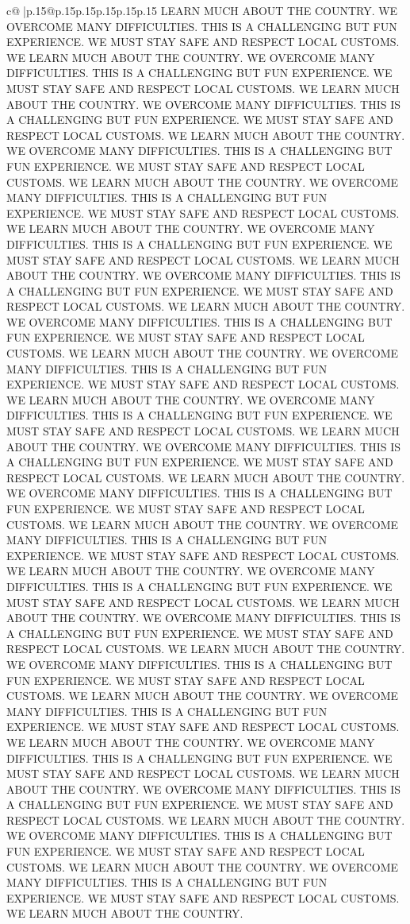 \documentclass{article}
\begin{document}
{\begin{supertabular}{c@{$\;$}|p{.15\linewidth}@{}p{.15\linewidth}p{.15\linewidth}p{.15\linewidth}p{.15\linewidth}p{.15\linewidth}}
{{{LEARN MUCH ABOUT THE COUNTRY. WE OVERCOME MANY DIFFICULTIES. THIS IS A CHALLENGING BUT FUN EXPERIENCE. WE MUST STAY SAFE AND RESPECT LOCAL CUSTOMS. WE LEARN MUCH ABOUT THE COUNTRY. WE OVERCOME MANY DIFFICULTIES. THIS IS A CHALLENGING BUT FUN EXPERIENCE. WE MUST STAY SAFE AND RESPECT LOCAL CUSTOMS. WE LEARN MUCH ABOUT THE COUNTRY. WE OVERCOME MANY DIFFICULTIES. THIS IS A CHALLENGING BUT FUN EXPERIENCE. WE MUST STAY SAFE AND RESPECT LOCAL CUSTOMS. WE LEARN MUCH ABOUT THE COUNTRY. WE OVERCOME MANY DIFFICULTIES. THIS IS A CHALLENGING BUT FUN EXPERIENCE. WE MUST STAY SAFE AND RESPECT LOCAL CUSTOMS. WE LEARN MUCH ABOUT THE COUNTRY. WE OVERCOME MANY DIFFICULTIES. THIS IS A CHALLENGING BUT FUN EXPERIENCE. WE MUST STAY SAFE AND RESPECT LOCAL CUSTOMS. WE LEARN MUCH ABOUT THE COUNTRY. WE OVERCOME MANY DIFFICULTIES. THIS IS A CHALLENGING BUT FUN EXPERIENCE. WE MUST STAY SAFE AND RESPECT LOCAL CUSTOMS. WE LEARN MUCH ABOUT THE COUNTRY. WE OVERCOME MANY DIFFICULTIES. THIS IS A CHALLENGING BUT FUN EXPERIENCE. WE MUST STAY SAFE AND RESPECT LOCAL CUSTOMS. WE LEARN MUCH ABOUT THE COUNTRY. WE OVERCOME MANY DIFFICULTIES. THIS IS A CHALLENGING BUT FUN EXPERIENCE. WE MUST STAY SAFE AND RESPECT LOCAL CUSTOMS. WE LEARN MUCH ABOUT THE COUNTRY. WE OVERCOME MANY DIFFICULTIES. THIS IS A CHALLENGING BUT FUN EXPERIENCE. WE MUST STAY SAFE AND RESPECT LOCAL CUSTOMS. WE LEARN MUCH ABOUT THE COUNTRY. WE OVERCOME MANY DIFFICULTIES. THIS IS A CHALLENGING BUT FUN EXPERIENCE. WE MUST STAY SAFE AND RESPECT LOCAL CUSTOMS. WE LEARN MUCH ABOUT THE COUNTRY. WE OVERCOME MANY DIFFICULTIES. THIS IS A CHALLENGING BUT FUN EXPERIENCE. WE MUST STAY SAFE AND RESPECT LOCAL CUSTOMS. WE LEARN MUCH ABOUT THE COUNTRY. WE OVERCOME MANY DIFFICULTIES. THIS IS A CHALLENGING BUT FUN EXPERIENCE. WE MUST STAY SAFE AND RESPECT LOCAL CUSTOMS. WE LEARN MUCH ABOUT THE COUNTRY. WE OVERCOME MANY DIFFICULTIES. THIS IS A CHALLENGING BUT FUN EXPERIENCE. WE MUST STAY SAFE AND RESPECT LOCAL CUSTOMS. WE LEARN MUCH ABOUT THE COUNTRY. WE OVERCOME MANY DIFFICULTIES. THIS IS A CHALLENGING BUT FUN EXPERIENCE. WE MUST STAY SAFE AND RESPECT LOCAL CUSTOMS. WE LEARN MUCH ABOUT THE COUNTRY. WE OVERCOME MANY DIFFICULTIES. THIS IS A CHALLENGING BUT FUN EXPERIENCE. WE MUST STAY SAFE AND RESPECT LOCAL CUSTOMS. WE LEARN MUCH ABOUT THE COUNTRY. WE OVERCOME MANY DIFFICULTIES. THIS IS A CHALLENGING BUT FUN EXPERIENCE. WE MUST STAY SAFE AND RESPECT LOCAL CUSTOMS. WE LEARN MUCH ABOUT THE COUNTRY. WE OVERCOME MANY DIFFICULTIES. THIS IS A CHALLENGING BUT FUN EXPERIENCE. WE MUST STAY SAFE AND RESPECT LOCAL CUSTOMS. WE LEARN MUCH ABOUT THE COUNTRY. WE OVERCOME MANY DIFFICULTIES. THIS IS A CHALLENGING BUT FUN EXPERIENCE. WE MUST STAY SAFE AND RESPECT LOCAL CUSTOMS. WE LEARN MUCH ABOUT THE COUNTRY. WE OVERCOME MANY DIFFICULTIES. THIS IS A CHALLENGING BUT FUN EXPERIENCE. WE MUST STAY SAFE AND RESPECT LOCAL CUSTOMS. WE LEARN MUCH ABOUT THE COUNTRY. WE OVERCOME MANY DIFFICULTIES. THIS IS A CHALLENGING BUT FUN EXPERIENCE. WE MUST STAY SAFE AND RESPECT LOCAL CUSTOMS. WE LEARN MUCH ABOUT THE COUNTRY. WE OVERCOME MANY DIFFICULTIES. THIS IS A CHALLENGING BUT FUN EXPERIENCE. WE MUST STAY SAFE AND RESPECT LOCAL CUSTOMS. WE LEARN MUCH ABOUT THE COUNTRY. }}}
\end{supertabular}}
\end{document}
